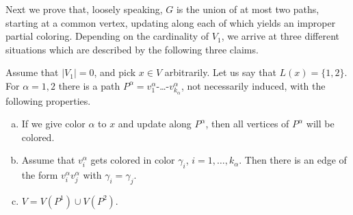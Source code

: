 \documentclass[11pt]{article}
\begin{document}
Next we prove that, loosely speaking, $G$ is the union of at most two paths, starting at a common vertex, updating along each of which yields an
improper partial coloring.
Depending on the cardinality of $V_1$, we arrive at three different situations which are described by the following three claims.

\begin{claim}\label{clm:V1=0}
Assume that $|V_1|=0$, and pick $x \in V$ arbitrarily.
Let us say that $L(x)=\{1,2\}$.
For $\alpha=1,2$ there is a path $P^{\alpha}=v_1^{\alpha}$-\ldots-$v_{k_{\alpha}}^{\alpha}$, not necessarily induced, with the following properties.
\begin{enumerate}[(a)]
	\item If we give color $\alpha$ to $x$ and update along $P^{\alpha}$, then all vertices of $P^{\alpha}$ will be colored.
	\item Assume that $v^{\alpha}_i$ gets colored in color $\gamma_i$, $i=1,\ldots,k_{\alpha}$.
				Then there is an edge of the form $v^{\alpha}_iv^{\alpha}_j$ with $\gamma_i=\gamma_j$.
	\item $V = V(P^1) \cup V(P^2)$.
\end{enumerate}	
\end{claim}
\end{document}
